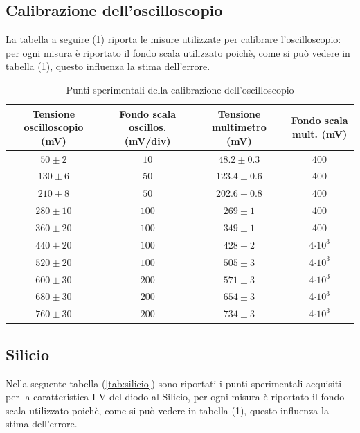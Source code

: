 \documentclass[]{article}
\begin{document}
\subsection{Calibrazione dell'oscilloscopio}
La tabella a seguire (\ref{tab:calibrazione}) riporta le misure utilizzate per calibrare l'oscilloscopio: per ogni misura è riportato il fondo scala utilizzato poichè, come si può vedere in tabella (1), questo influenza la stima dell'errore. 
	\begin{table}[H]
		\centering
	\begin{tabular}{|c|c|c|c|}
		\hline
		Tensione oscilloscopio (mV)& Fondo scala oscillos. (mV/div) & Tensione multimetro (mV) & Fondo scala mult. (mV) \\
		\hline
		$ 50\pm 2 $ &$ 10 $ & $ 48.2\pm 0.3 $ &400\\
		\hline
		$ 130\pm 6$ &$ 50 $ & $ 123.4\pm 0.6 $ &400\\
		\hline
		$ 210\pm 8 $ &$ 50 $ & $ 202.6\pm 0.8 $ &400\\
		\hline
		$ 280\pm 10$ &$ 100 $ & $ 269\pm 1 $ &400\\
		\hline
		$ 360\pm 20 $ &$ 100 $ & $ 349\pm 1 $ &400\\
		\hline
		$ 440\pm 20 $ &$ 100 $ & $ 428\pm 2 $ &4$\cdot10^3$\\
		\hline
		$ 520\pm 20 $ &$ 100 $ & $ 505\pm 3 $ &4$\cdot10^3$\\
		\hline
		$ 600\pm 30 $ &$ 200 $ & $ 571\pm 3 $ &4$\cdot10^3$\\
		\hline
		$ 680\pm 30 $ &$ 200 $ & $ 654\pm 3 $&4$\cdot10^3$ \\
		\hline
		$ 760\pm 30 $ &$ 200 $ & $ 734\pm 3 $&4$\cdot10^3$ \\
		\hline
		
	\end{tabular}
\caption{Punti sperimentali della calibrazione dell'oscilloscopio}
\label{tab:calibrazione}
\end{table}
\subsection{Silicio}
Nella seguente tabella (\ref{tab:silicio}) sono riportati i punti sperimentali acquisiti per la caratteristica I-V del diodo al Silicio, per ogni misura è riportato il fondo scala utilizzato poichè, come si può vedere in tabella (1), questo influenza la stima dell'errore.
\end{document}
